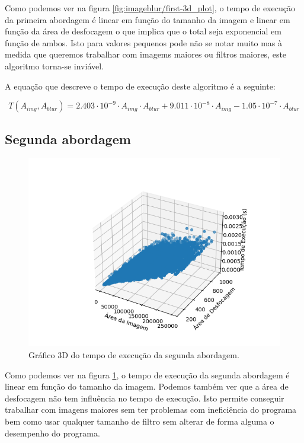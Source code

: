 Como podemos ver na figura \ref{fig:imageblur/first-3d_plot}, o tempo de execução da primeira abordagem é linear em função do tamanho da imagem e linear em função da área de desfocagem o que implica que o total seja exponencial em função de ambos. Isto para valores pequenos pode não se notar muito mas à medida que queremos trabalhar com imagems maiores ou filtros maiores, este algoritmo torna-se inviável.

A equação que descreve o tempo de execução deste algoritmo é a seguinte:

\begin{equation}
    \label{eq:imageblur/first-time}
    T(A_{img}, A_{blur}) = 2.403 \cdot 10^{-9} \cdot A_{img} \cdot A_{blur} + 9.011 \cdot 10^{-8} \cdot A_{img} - 1.05 \cdot 10^{-7} \cdot A_{blur}
\end{equation}

\subsection{Segunda abordagem}

\begin{figure}[H]
    \centering
    \includegraphics[width=\linewidth]{images/second-3d_plot.png}
    \caption{Gráfico 3D do tempo de execução da segunda abordagem.}
    \label{fig:imageblur/second-3d_plot}
\end{figure}

Como podemos ver na figura \ref{fig:imageblur/second-3d_plot}, o tempo de execução da segunda abordagem é linear em função do tamanho da imagem. Podemos também ver que a área de desfocagem não tem influência no tempo de execução. Isto permite conseguir trabalhar com imagens maiores sem ter problemas com ineficiência do programa bem como usar qualquer tamanho de filtro sem alterar de forma alguma o desempenho do programa.

